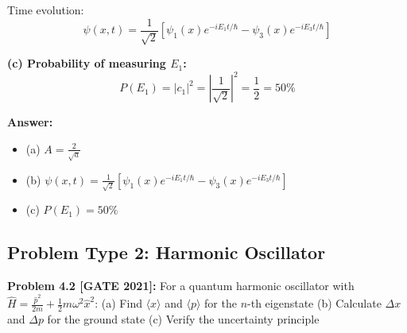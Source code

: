 \documentclass[12pt,a4paper]{article}
\begin{document}
\begin{solution}
Time evolution:
$$\psi(x,t) = \frac{1}{\sqrt{2}}[\psi_1(x)e^{-iE_1t/\hbar} - \psi_3(x)e^{-iE_3t/\hbar}]$$

\textbf{(c) Probability of measuring $E_1$:}
$$P(E_1) = |c_1|^2 = \left|\frac{1}{\sqrt{2}}\right|^2 = \frac{1}{2} = 50\%$$

\textbf{Answer:}
\begin{itemize}
    \item (a) $A = \frac{2}{\sqrt{a}}$
    \item (b) $\psi(x,t) = \frac{1}{\sqrt{2}}[\psi_1(x)e^{-iE_1t/\hbar} - \psi_3(x)e^{-iE_3t/\hbar}]$
    \item (c) $P(E_1) = 50\%$
\end{itemize}
\end{solution}

\subsection{Problem Type 2: Harmonic Oscillator}

\textbf{Problem 4.2 [GATE 2021]:} For a quantum harmonic oscillator with $\hat{H} = \frac{\hat{p}^2}{2m} + \frac{1}{2}m\omega^2\hat{x}^2$:
(a) Find $\langle x \rangle$ and $\langle p \rangle$ for the $n$-th eigenstate
(b) Calculate $\Delta x$ and $\Delta p$ for the ground state
(c) Verify the uncertainty principle
\end{document}
